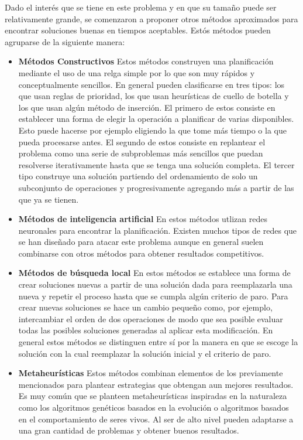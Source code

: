 Dado el interés que se tiene en este problema y en que su tamaño puede ser relativamente grande, se comenzaron a proponer otros métodos aproximados para encontrar soluciones buenas en tiempos aceptables. Estós métodos pueden agruparse de la siguiente manera\cite{Zhang2019}:
\begin{itemize}
\item \textbf{Métodos Constructivos} Estos métodos construyen una planificación mediante el uso de una relga simple por lo que son muy rápidos y conceptualmente sencillos. En general pueden clasificarse en tres tipos: los que usan reglas de prioridad, los que usan heurísticas de cuello de botella y los que usan algún método de inserción. El primero de estos consiste en establecer una forma de elegir la operación a planificar de varias disponibles. Esto puede hacerse por ejemplo eligiendo la que tome más tiempo o la que pueda procesarse antes. El segundo de estos consiste en replantear el problema como una serie de subproblemas más sencillos que puedan resolverse iterativamente hasta que se tenga una solución completa. El tercer tipo construye una solución partiendo del ordenamiento de solo un subconjunto de operaciones y progresivamente agregando más a partir de las que ya se tienen.
\item \textbf{Métodos de inteligencia artificial} En estos métodos utlizan redes neuronales para encontrar la planificación. Existen muchos tipos de redes que se han diseñado para atacar este problema aunque en general suelen combinarse con otros métodos para obtener resultados competitivos.
\item \textbf{Métodos de búsqueda local} En estos métodos se establece una forma de crear soluciones nuevas a partir de una solución dada para reemplazarla una nueva y repetir el proceso hasta que se cumpla algún criterio de paro. Para crear nuevas soluciones se hace un cambio pequeño como, por ejemplo, intercambiar el orden de dos operaciones de modo que sea posible evaluar todas las posibles soluciones generadas al aplicar esta modificación. En general estos métodos se distinguen entre sí por la manera en que se escoge la solución con la cual reemplazar la solución inicial y el criterio de paro.
\item \textbf{Metaheurísticas} Estos métodos combinan elementos de los previamente mencionados para plantear estrategias que obtengan aun mejores resultados. Es muy común que se planteen metaheurísticas inspiradas en la naturaleza como los algoritmos genéticos basados en la evolución o algoritmos basados en el comportamiento de seres vivos. Al ser de alto nivel pueden adaptarse a una gran cantidad de problemas y obtener buenos resultados.   
\end{itemize}

